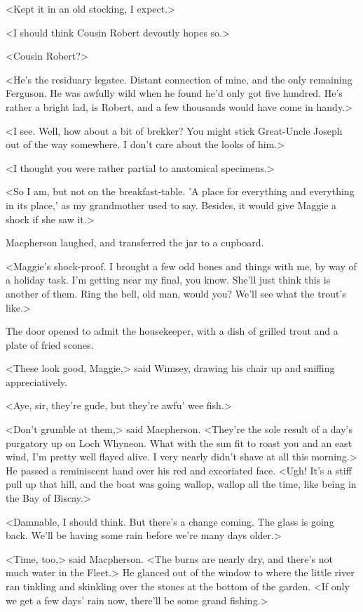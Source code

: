 <Kept it in an old stocking, I expect.>

<I should think Cousin Robert devoutly hopes so.>

<Cousin Robert?>

<He's the residuary legatee. Distant connection of mine, and the only remaining Ferguson. He was awfully wild when he found he'd only got five hundred. He's rather a bright lad, is Robert, and a few thousands would have come in handy.>

<I see. Well, how about a bit of brekker? You might stick Great-Uncle Joseph out of the way somewhere. I don't care about the looks of him.>

<I thought you were rather partial to anatomical specimens.>

<So I am, but not on the breakfast-table. 'A place for everything and everything in its place,' as my grandmother used to say. Besides, it would give Maggie a shock if she saw it.>

Macpherson laughed, and transferred the jar to a cupboard.

<Maggie's shock-proof. I brought a few odd bones and things with me, by way of a holiday task. I'm getting near my final, you know. She'll just think this is another of them. Ring the bell, old man, would you? We'll see what the trout's like.>

The door opened to admit the housekeeper, with a dish of grilled trout and a plate of fried scones.

<These look good, Maggie,> said Wimsey, drawing his chair up and sniffing appreciatively.

<Aye, sir, they're gude, but they're awfu' wee fish.>

<Don't grumble at them,> said Macpherson. <They're the sole result of a day's purgatory up on Loch Whyneon. What with the sun fit to roast you and an east wind, I'm pretty well flayed alive. I very nearly didn't shave at all this morning.> He passed a reminiscent hand over his red and excoriated face. <Ugh! It's a stiff pull up that hill, and the boat was going wallop, wallop all the time, like being in the Bay of Biscay.>

<Damnable, I should think. But there's a change coming. The glass is going back. We'll be having some rain before we're many days older.>

<Time, too,> said Macpherson. <The burns are nearly dry, and there's not much water in the Fleet.> He glanced out of the window to where the little river ran tinkling and skinkling over the stones at the bottom of the garden. <If only we get a few days' rain now, there'll be some grand fishing.>

